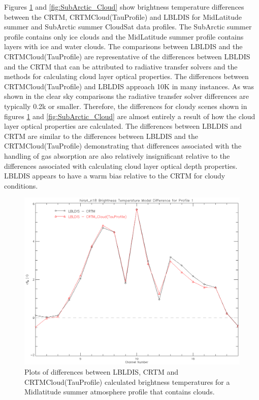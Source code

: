 Figures \ref{fig:MidLat_Cloud} and \ref{fig:SubArctic_Cloud} show brightness temperature differences between the CRTM, CRTM\textunderscore{}Cloud(TauProfile) and LBLDIS for
MidLatitude summer and SubArctic summer CloudSat data profiles. The SubArctic summer profile contains only ice clouds and the MidLatitude summer profile contains layers with ice and water clouds. The comparisons between LBLDIS and the CRTM\textunderscore{}Cloud(TauProfile) are representative of the differences between LBLDIS and the CRTM that can be attributed to radiative transfer solvers and the methods for calculating cloud layer optical properties. The differences between CRTM\textunderscore{}Cloud(TauProfile) and LBLDIS approach 10K in many instances. As was shown in the clear sky comparisons the radiative transfer solver differences are typically 0.2k or smaller. Therefore, the differences for cloudy scenes shown in figures \ref{fig:MidLat_Cloud} and \ref{fig:SubArctic_Cloud} are almost entirely a result of how the cloud layer optical properties are calculated. The differences between LBLDIS and CRTM are similar to the differences between LBLDIS and the CRTM\textunderscore{}Cloud(TauProfile) demonstrating that differences associated with the handling of gas absorption are also relatively insignificant relative to the differences associated with calculating cloud layer optical depth properties. LBLDIS appears to have a warm bias relative to the CRTM for cloudy conditions.

\newpage{}
\begin{figure}[htp]
  \centering{}
  \includegraphics[scale=0.8]{./graphics/Midlatitude_Clouds_01.eps}
  \caption{Plots of differences between LBLDIS, CRTM and CRTM\textunderscore{}Cloud(TauProfile) calculated brightness temperatures for 
   a Midlatitude summer atmosphere profile that contains clouds.}
  \label{fig:MidLat_Cloud}
\end{figure}


